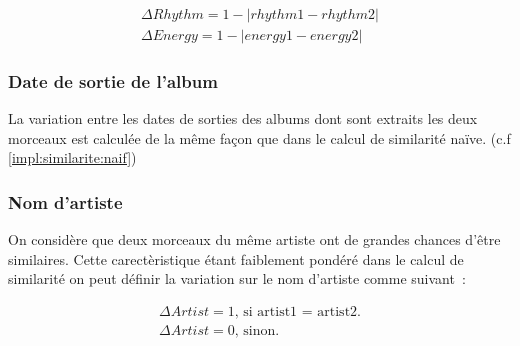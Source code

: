 \begin{align}
  \Delta Rhythm = 1 - |rhythm1 - rhythm2|\\
  \Delta Energy = 1 - |energy1 - energy2|
\end{align}

\subsubsection{Date de sortie de l'album}
\label{impl:similarite:complet:date}

La variation entre les dates de sorties des albums dont sont extraits les deux morceaux est calculée de la même façon que dans le calcul de similarité naïve. (c.f \ref{impl:similarite:naif})

\subsubsection{Nom d'artiste}
\label{impl:similarite:complet:name}

On considère que deux morceaux du même artiste ont de grandes chances d'être similaires. Cette carectèristique étant faiblement pondéré dans le calcul de similarité on peut définir la variation sur le nom d'artiste comme suivant~:

\begin{align}
  \Delta Artist = \text{1, si artist1 = artist2.}\\
  \Delta Artist = \text{0, sinon.}
\end{align}